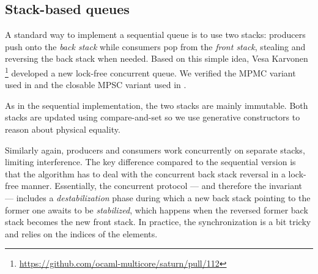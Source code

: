 \subsection{Stack-based queues}

A standard way to implement a sequential queue is to use two stacks: producers push onto the \emph{back stack} while consumers pop from the \emph{front stack}, stealing and reversing the back stack when needed.
Based on this simple idea, Vesa Karvonen%
\footnote{
\url{https://github.com/ocaml-multicore/saturn/pull/112}
}
developed a new lock-free concurrent queue.
We verified the MPMC variant used in \Picos and the closable MPSC variant used in \Eio.

As in the sequential implementation, the two stacks are mainly immutable.
Both stacks are updated using compare-and-set so we use generative constructors to reason about physical equality.

Similarly again, producers and consumers work concurrently on separate stacks, limiting interference.
The key difference compared to the sequential version is that the algorithm has to deal with the concurrent back stack reversal in a lock-free manner.
Essentially, the concurrent protocol --- and therefore the \Iris invariant --- includes a \emph{destabilization} phase during which a new back stack pointing to the former one awaits to be \emph{stabilized}, which happens when the reversed former back stack becomes the new front stack.
In practice, the synchronization is a bit tricky and relies on the indices of the elements.

